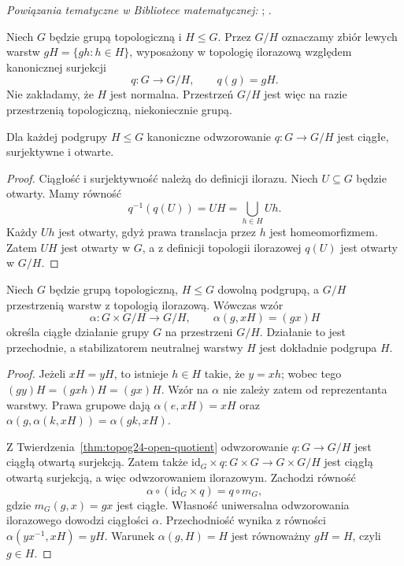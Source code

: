 \noindent\emph{Powiązania tematyczne w Bibliotece matematycznej:} ; .


\begin{definicja}
\label{def:topog24-cosetspace}
Niech \(G\) będzie grupą topologiczną
i \(H\le G\). Przez \(G/H\)
oznaczamy zbiór lewych warstw
\(gH=\{gh:h\in H\}\),
wyposażony w topologię ilorazową
względem kanonicznej surjekcji
\[
 q\colon G\to G/H,\qquad q(g)=gH.
\]
Nie zakładamy, że \(H\) jest normalna.
Przestrzeń \(G/H\) jest więc
na razie przestrzenią topologiczną,
niekoniecznie grupą.
\end{definicja}

\begin{twierdzenie}
\label{thm:topog24-open-quotient}
Dla każdej podgrupy \(H\le G\)
kanoniczne odwzorowanie
\(q\colon G\to G/H\) jest ciągłe,
surjektywne i otwarte.
\end{twierdzenie}
\begin{proof}
Ciągłość i surjektywność
należą do definicji ilorazu.
Niech \(U\subseteq G\) będzie otwarty.
Mamy równość
\[
 q^{-1}(q(U))=UH
  =\bigcup_{h\in H}Uh.
\]
Każdy \(Uh\) jest otwarty,
gdyż prawa translacja przez \(h\)
jest homeomorfizmem.
Zatem \(UH\) jest otwarty w \(G\),
a z definicji topologii ilorazowej
\(q(U)\) jest otwarty w \(G/H\).
\end{proof}

\begin{twierdzenie}
\label{thm:topog24-coset-action}
Niech \(G\) będzie grupą topologiczną,
\(H\le G\) dowolną podgrupą,
a \(G/H\) przestrzenią warstw z topologią ilorazową.
Wówczas wzór
\[
 \alpha\colon G\times G/H\to G/H,\qquad
 \alpha(g,xH)=(gx)H
\]
określa ciągłe działanie grupy \(G\)
na przestrzeni \(G/H\).
Działanie to jest przechodnie,
a stabilizatorem neutralnej warstwy \(H\)
jest dokładnie podgrupa \(H\).
\end{twierdzenie}
\begin{proof}
Jeżeli \(xH=yH\), to istnieje
\(h\in H\) takie, że \(y=xh\);
wobec tego \((gy)H=(gxh)H=(gx)H\).
Wzór na \(\alpha\) nie zależy
zatem od reprezentanta warstwy.
Prawa grupowe dają
\(\alpha(e,xH)=xH\) oraz
\(\alpha(g,\alpha(k,xH))=\alpha(gk,xH)\).

Z Twierdzenia~\ref{thm:topog24-open-quotient}
odwzorowanie \(q\colon G\to G/H\)
jest ciągłą otwartą surjekcją.
Zatem także
\(\mathrm{id}_G\times q\colon
G\times G\to G\times G/H\)
jest ciągłą otwartą surjekcją,
a więc odwzorowaniem ilorazowym.
Zachodzi równość
\[
 \alpha\circ(\mathrm{id}_G\times q)
 =q\circ m_G,
\]
gdzie \(m_G(g,x)=gx\) jest ciągłe.
Własność uniwersalna
odwzorowania ilorazowego
dowodzi ciągłości \(\alpha\).
Przechodniość wynika z równości
\(\alpha(yx^{-1},xH)=yH\).
Warunek \(\alpha(g,H)=H\)
jest równoważny \(gH=H\),
czyli \(g\in H\).
\end{proof}

